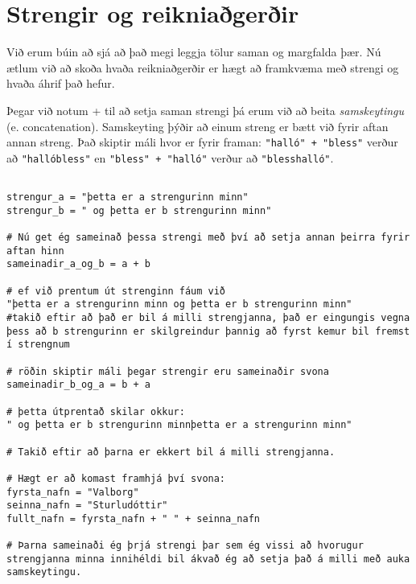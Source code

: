 \section{Strengir og reikniaðgerðir}
Við erum búin að sjá að það megi leggja tölur saman og margfalda þær.
Nú ætlum við að skoða hvaða reikniaðgerðir er hægt að framkvæma með strengi og hvaða áhrif það hefur.

Þegar við notum + til að setja saman strengi þá erum við að beita \textit{samskeytingu} (e. concatenation).
Samskeyting þýðir að einum streng er bætt við fyrir aftan annan streng.
Það skiptir máli hvor er fyrir framan: \texttt{"halló" + "bless"} verður að \texttt{"hallóbless"} en \texttt{"bless" + "halló"} verður að \texttt{"blesshalló"}.

\begin{lstlisting}[caption=Samskeyting strengja]

strengur_a = "þetta er a strengurinn minn"
strengur_b = " og þetta er b strengurinn minn"

# Nú get ég sameinað þessa strengi með því að setja annan þeirra fyrir aftan hinn
sameinadir_a_og_b = a + b

# ef við prentum út strenginn fáum við 
"þetta er a strengurinn minn og þetta er b strengurinn minn"
#takið eftir að það er bil á milli strengjanna, það er eingungis vegna þess að b strengurinn er skilgreindur þannig að fyrst kemur bil fremst í strengnum

# röðin skiptir máli þegar strengir eru sameinaðir svona
sameinadir_b_og_a = b + a

# þetta útprentað skilar okkur:
" og þetta er b strengurinn minnþetta er a strengurinn minn"

# Takið eftir að þarna er ekkert bil á milli strengjanna.

# Hægt er að komast framhjá því svona:
fyrsta_nafn = "Valborg"
seinna_nafn = "Sturludóttir"
fullt_nafn = fyrsta_nafn + " " + seinna_nafn

# Þarna sameinaði ég þrjá strengi þar sem ég vissi að hvorugur strengjanna minna innihéldi bil ákvað ég að setja það á milli með auka samskeytingu.
\end{lstlisting}

